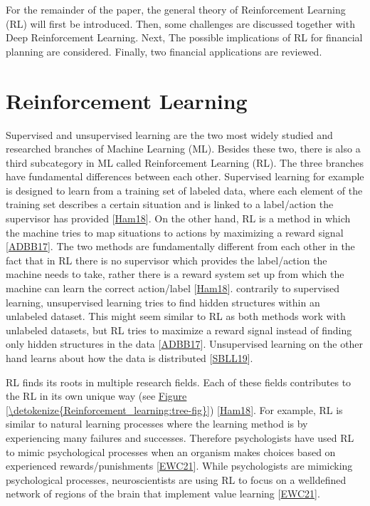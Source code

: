\documentclass[letterpaper,10pt,english]{jupyterBook}
\begin{document}
\sphinxAtStartPar
For the remainder of the paper, the general theory of Reinforcement Learning (RL) will first be introduced. Then, some challenges are discussed together with Deep Reinforcement Learning. Next, The possible implications of RL for financial planning are considered. Finally, two financial applications are reviewed.


\chapter{Reinforcement Learning}
\label{\detokenize{Reinforcement_learning:reinforcement-learning}}\label{\detokenize{Reinforcement_learning::doc}}
\sphinxAtStartPar
Supervised and unsupervised learning are the two most widely studied and researched branches of Machine Learning (ML). Besides these two, there is also a third subcategory in ML called Reinforcement Learning (RL). The three branches have fundamental differences between each other. Supervised learning for example is designed to learn from a training set of labeled data, where each element of the training set describes a certain situation and is linked to a label/action the supervisor has provided {[}\hyperlink{cite.Discussion:id49}{Ham18}{]}. On the other hand, RL is a method in which the machine tries to map situations to actions by maximizing a reward signal {[}\hyperlink{cite.Discussion:id50}{ADBB17}{]}. The two methods are fundamentally different from each other in the fact that in RL there is no supervisor which provides the label/action the machine needs to take, rather there is a reward system set up from which the machine can learn the correct action/label {[}\hyperlink{cite.Discussion:id49}{Ham18}{]}. contrarily to supervised learning, unsupervised learning tries to find hidden structures within an unlabeled dataset. This might seem similar to RL as both methods work with unlabeled datasets, but RL tries to maximize a reward signal instead of finding only hidden structures in the data {[}\hyperlink{cite.Discussion:id50}{ADBB17}{]}. Unsupervised learning on the other hand learns about how the data is distributed {[}\hyperlink{cite.Discussion:id42}{SBLL19}{]}.

\sphinxAtStartPar
RL finds its roots in multiple research fields. Each of these fields contributes to the RL in its own unique way (see \hyperref[\detokenize{Reinforcement_learning:tree-fig}]{Figure \ref{\detokenize{Reinforcement_learning:tree-fig}}}) {[}\hyperlink{cite.Discussion:id49}{Ham18}{]}. For example,  RL is similar to natural learning processes where the learning method is by experiencing many failures and successes. Therefore psychologists have used RL to mimic psychological processes when an organism makes choices based on experienced rewards/punishments {[}\hyperlink{cite.Discussion:id56}{EWC21}{]}. While psychologists are mimicking psychological processes, neuroscientists are using RL to focus on a well\sphinxhyphen{}defined network of regions of the brain that implement value learning {[}\hyperlink{cite.Discussion:id56}{EWC21}{]}.
\end{document}
